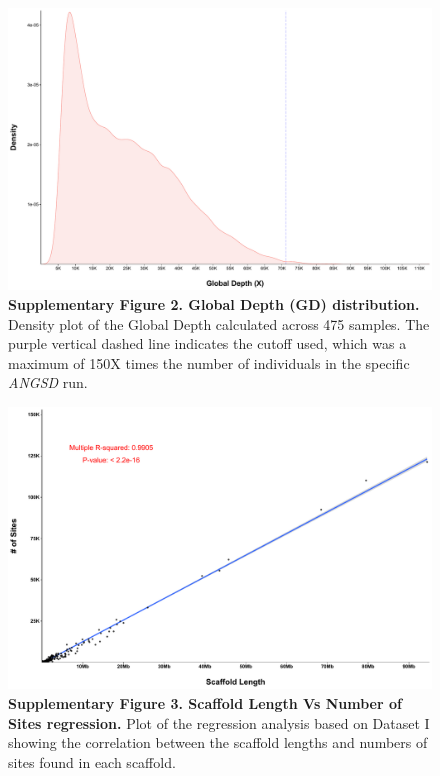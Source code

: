 \documentclass[twoside, british, a4paper]{article}
\begin{document}
\begin{figure}
\centering
\includegraphics[width=1\textwidth]{../FPG--Pipeline/FPG--Plots/FPG--Stats/FPG--GlobalCoverage/FPG--GlobalCoverage.pdf}
\captionsetup{labelformat=empty}
\caption[\textbf{Supplementary Figure 2. Global Depth (GD) distribution.}]{\textbf{Supplementary Figure 2. Global Depth (GD) distribution.} Density plot of the Global Depth calculated across 475 samples. The purple vertical dashed line indicates the cutoff used, which was a maximum of 150X times the number of individuals in the specific \textit{ANGSD} run.}
\label{SI:FPG--CovDistribution}
\end{figure}

\newpage
\clearpage

\begin{figure}
\centering
\includegraphics[width=1\textwidth]{../FPG--Pipeline/FPG--Plots/FPG--Stats/FPG--SitesInfo/FPG--Sites-ScaffoldsRegression.pdf}
\captionsetup{labelformat=empty}
\caption[\textbf{Supplementary Figure 3. Scaffold Length Vs Number of Sites regression.}]{\textbf{Supplementary Figure 3. Scaffold Length Vs Number of Sites regression.} Plot of the regression analysis based on Dataset I showing the correlation between the scaffold lengths and numbers of sites found in each scaffold.}
\label{SI:FPG--SitesInfo}
\end{figure}
\end{document}

